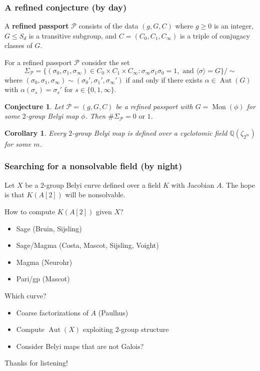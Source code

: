 \documentclass[handout, xcolor=dvipsnames]{beamer}
\DeclareMathOperator{\Mon}{Mon}
\DeclareMathOperator{\Aut}{Aut}
\theoremstyle{plain}
\newtheorem*{conj}{Conjecture}
\newtheorem*{cor}{Corollary}
\newcommand{\Q}{\mathbb Q}
\begin{document}
  \begin{frame}[plain]
    \frametitle{A refined conjecture (by day)}
    A \textbf{refined passport} $\mathcal{P}$ consists of the data
    $(g,G,C)$
    \newline
    where $g\geq 0$ is an integer,
    $G\leq S_d$ is a transitive subgroup,
    and $C = (C_0,C_1,C_\infty)$
    is a triple of conjugacy classes of $G$.
    \par
    \pause
    For a refined passport $\mathcal{P}$ consider the set
    \[
      \Sigma_\mathcal{P} =
      \{(\sigma_0,\sigma_1,\sigma_\infty)\in C_0\times C_1\times C_\infty : \sigma_\infty\sigma_1\sigma_0=1,\text{ and } \langle\sigma\rangle=G\}/\sim
    \]
    where $(\sigma_0,\sigma_1,\sigma_\infty)\sim(\sigma_0', \sigma_1', \sigma_\infty')$
    if and only if there exists $\alpha\in\Aut(G)$ with
    $\alpha(\sigma_s) = \sigma_s'$ for $s\in\{0,1,\infty\}$.
    \pause
    \begin{conj}
      Let $\mathcal{P} = (g,G,C)$
      be a refined passport with
      $G=\Mon(\phi)$ for some $2$-group Belyi map $\phi$.
      Then $\#\Sigma_\mathcal{P} = 0\text{ or }1$.
    \end{conj}
    \pause
    \begin{cor}
      Every $2$-group Belyi map is defined over a cyclotomic field
      $\Q(\zeta_{2^m})$ for some $m$.
    \end{cor}
  \end{frame}
  \begin{frame}[plain]
    \frametitle{Searching for a nonsolvable field (by night)}
    Let $X$ be a $2$-group Belyi curve
    defined over a field $K$
    with \newline Jacobian $A$.
    The hope is that $K(A[2])$ will be nonsolvable.
    \par
    How to compute $K(A[2])$ given $X$?
    \begin{itemize}
      \item
        Sage (Bruin, Sijsling)
      \item
        Sage/Magma (Costa, Mascot, Sijsling, Voight)
      \item
        Magma (Neurohr)
      \item
        Pari/gp (Mascot)
    \end{itemize}
    \par
    Which curve?
    \begin{itemize}
      \item
        Coarse factorizations of $A$ (Paulhus)
      \item
        Compute $\Aut(X)$ exploiting $2$-group structure
      \item
        Consider Belyi maps that are not Galois?
    \end{itemize}
    \pause
    Thanks for listening!
  \end{frame}
\end{document}

